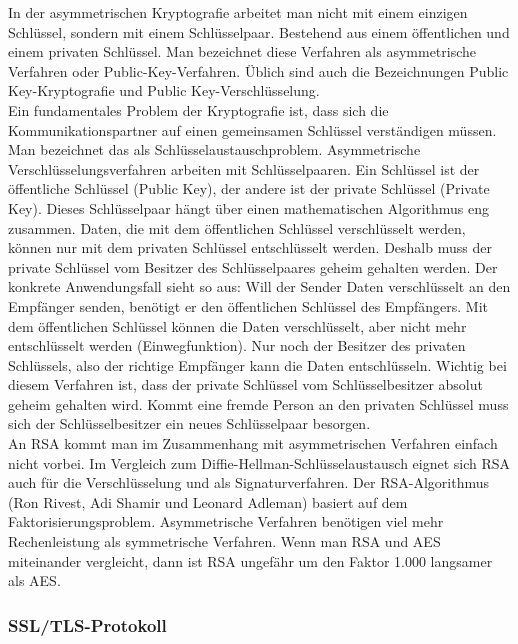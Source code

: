 \documentclass[letterpaper, 12pt]{article}
\let\tempsubsubsection\subsubsection
\renewcommand\subsubsection[1]{\vspace{0cm}\tempsubsubsection{#1}\vspace{0cm}}
\begin{document}
In der asymmetrischen Kryptografie arbeitet man nicht mit einem einzigen Schlüssel, sondern mit einem Schlüsselpaar. Bestehend aus einem öffentlichen und einem privaten Schlüssel. Man bezeichnet diese Verfahren als asymmetrische Verfahren oder Public-Key-Verfahren. Üblich sind auch die Bezeichnungen Public Key-Kryptografie und Public Key-Verschlüsselung. \\
Ein fundamentales Problem der Kryptografie ist, dass sich die Kommunikationspartner auf einen gemeinsamen Schlüssel verständigen müssen. Man bezeichnet das als Schlüsselaustauschproblem. Asymmetrische Verschlüsselungsverfahren arbeiten mit Schlüsselpaaren. Ein Schlüssel ist der öffentliche Schlüssel (Public Key), der andere ist der private Schlüssel (Private Key). Dieses Schlüsselpaar hängt über einen mathematischen Algorithmus eng zusammen. Daten, die mit dem öffentlichen Schlüssel verschlüsselt werden, können nur mit dem privaten Schlüssel entschlüsselt werden. Deshalb muss der private Schlüssel vom Besitzer des Schlüsselpaares geheim gehalten werden. Der konkrete Anwendungsfall sieht so aus: Will der Sender Daten verschlüsselt an den Empfänger senden, benötigt er den öffentlichen Schlüssel des Empfängers. Mit dem öffentlichen Schlüssel können die Daten verschlüsselt, aber nicht mehr entschlüsselt werden (Einwegfunktion). Nur noch der Besitzer des privaten Schlüssels, also der richtige Empfänger kann die Daten entschlüsseln. Wichtig bei diesem Verfahren ist, dass der private Schlüssel vom Schlüsselbesitzer absolut geheim gehalten wird. Kommt eine fremde Person an den privaten Schlüssel muss sich der Schlüsselbesitzer ein neues Schlüsselpaar besorgen. \\
An RSA kommt man im Zusammenhang mit asymmetrischen Verfahren einfach nicht vorbei. Im Vergleich zum Diffie-Hellman-Schlüsselaustausch eignet sich RSA auch für die Verschlüsselung und als Signaturverfahren. Der RSA-Algorithmus (Ron Rivest, Adi Shamir und Leonard Adleman) basiert auf dem Faktorisierungsproblem.
Asymmetrische Verfahren benötigen viel mehr Rechenleistung als symmetrische Verfahren. Wenn man RSA und AES miteinander vergleicht, dann ist RSA ungefähr um den Faktor 1.000 langsamer als AES. \cite{ausarbeitungsec}

\subsubsection{SSL/TLS-Protokoll}
\end{document}
